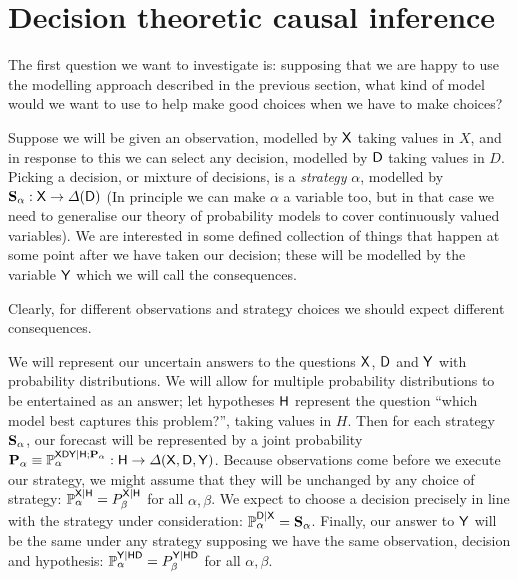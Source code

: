 
\section{Decision theoretic causal inference}\label{sec:seedo_models}

The first question we want to investigate is: supposing that we are happy to use the modelling approach described in the previous section, what kind of model would we want to use to help make good choices when we have to make choices?

Suppose we will be given an observation, modelled by $\mathsf{X}$ taking values in $X$, and in response to this we can select any decision, modelled by $\mathsf{D}$ taking values in $D$. Picking a decision, or mixture of decisions, is a \emph{strategy} $\alpha$, modelled by $\mathbf{S}_\alpha:\mathsf{X}\to \Delta(\mathsf{D})$ (In principle we can make $\alpha$ a variable too, but in that case we need to generalise our theory of probability models to cover continuously valued variables). We are interested in some defined collection of things that happen at some point after we have taken our decision; these will be modelled by the variable $\mathsf{Y}$ which we will call the consequences.

Clearly, for different observations and strategy choices we should expect different consequences. 

We will represent our uncertain answers to the questions $\mathsf{X}$, $\mathsf{D}$ and $\mathsf{Y}$ with probability distributions. We will allow for multiple probability distributions to be entertained as an answer; let hypotheses $\mathsf{H}$ represent the question ``which model best captures this problem?'', taking values in $H$. Then for each strategy $\mathbf{S}_\alpha$, our forecast will be represented by a joint probability $\mathbf{P}_{\alpha}\equiv\mathbb{P}_\alpha^{\mathsf{XDY}|\mathsf{H};\mathbf{P}_\alpha}:\mathsf{H}\to\Delta(\mathsf{X},\mathsf{D},\mathsf{Y})$. Because observations come before we execute our strategy, we might assume that they will be unchanged by any choice of strategy: $\mathbb{P}_{\alpha}^{\mathsf{X}|\mathsf{H}}=P_{\beta}^{\mathsf{X}|\mathsf{H}}$ for all $\alpha,\beta$. We expect to choose a decision precisely in line with the strategy under consideration: $\mathbb{P}_{\alpha}^{\mathsf{D}|\mathsf{X}}=\mathbf{S}_\alpha$. Finally, our answer to $\mathsf{Y}$ will be the same under any strategy supposing we have the same observation, decision and hypothesis: $\mathbb{P}_{\alpha}^{\mathsf{Y}|\mathsf{HD}}=P_{\beta}^{\mathsf{Y}|\mathsf{HD}}$ for all $\alpha,\beta$.

